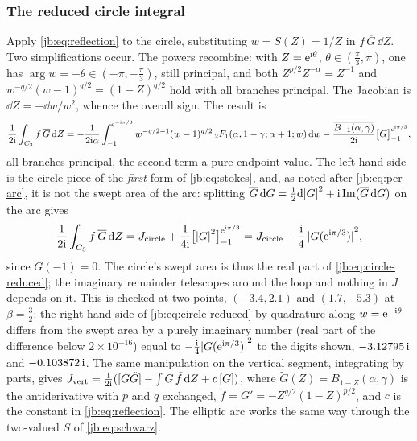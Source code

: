 \subsubsection{The reduced circle integral}
\label{jb:sec:obstruction:circle}

Apply \eqref{jb:eq:reflection} to the circle, substituting $w = S(Z) = 1/Z$ in
$f \, \overline{G} \, \dd Z$.
Two simplifications occur.
The powers recombine: with $Z = \mathrm{e}^{\mathrm{i} \theta}$, $\theta \in (\tfrac{\pi}{3}, \pi)$, one has
$\arg w = -\theta \in (-\pi, -\tfrac{\pi}{3})$, still principal, and both
$Z^{p/2} Z^{-\alpha} = Z^{-1}$ and $w^{-q/2} (w - 1)^{q/2} = (1 - Z)^{q/2}$ hold with all branches
principal.
The Jacobian is $\dd Z = - \dd w / w^2$, whence the overall sign.
The result is
\begin{equation}
  \label{jb:eq:circle-reduced}
  \frac{1}{2 \mathrm{i}} \int_{C_3} f \, \overline{G} \, \mathrm{d} Z
    = - \frac{1}{2 \mathrm{i} \alpha} \int_{-1}^{\mathrm{e}^{- \mathrm{i} \pi/3}}
      w^{- q/2 - 1} (w - 1)^{q/2} \,
      {}_2F_1(\alpha, 1 - \gamma; \alpha + 1; w) \, \mathrm{d} w
      - \frac{\overline{B_{-1}(\alpha, \gamma)}}{2 \mathrm{i}}
      \bigl[ G \bigr]_{-1}^{\mathrm{e}^{\mathrm{i} \pi/3}},
\end{equation}
all branches principal, the second term a pure endpoint value.
The left-hand side is the circle piece of the \emph{first} form of \eqref{jb:eq:stokes}, and, as
noted after \eqref{jb:eq:per-arc}, it is not the swept area of the arc: splitting
$\overline{G} \, \mathrm{d} G = \tfrac12 \mathrm{d} {|G|}^2 + \mathrm{i} \operatorname{Im}(\overline{G} \, \mathrm{d} G)$ on the arc gives
\begin{equation}
  \label{jb:eq:circle-first-form}
  \frac{1}{2 \mathrm{i}} \int_{C_3} f \, \overline{G} \, \mathrm{d} Z
    = J_{\text{circle}}
      + \frac{1}{4 \mathrm{i}} \bigl[ {|G|}^2 \bigr]_{-1}^{\mathrm{e}^{\mathrm{i} \pi/3}}
    = J_{\text{circle}}
      - \frac{\mathrm{i}}{4} \, {|G(\mathrm{e}^{\mathrm{i} \pi/3})|}^2,
\end{equation}
since $G(-1) = 0$.
The circle's swept area is thus the real part of \eqref{jb:eq:circle-reduced}; the imaginary
remainder telescopes around the loop and nothing in $J$ depends on it.
This is checked at two points, $(-3.4, 2.1)$ and $(1.7, -5.3)$ at $\beta = \tfrac32$: the
right-hand side of \eqref{jb:eq:circle-reduced} by quadrature along $w = \mathrm{e}^{-\mathrm{i}\theta}$ differs from
the swept area by a purely imaginary number (real part of the difference below
$2 \times 10^{-16}$) equal to $- \tfrac{\mathrm{i}}{4} {|G(\mathrm{e}^{\mathrm{i} \pi/3})|}^2$ to the digits shown,
$-3.12795 \, \mathrm{i}$ and $-0.103872 \, \mathrm{i}$.
The same manipulation on the vertical segment, integrating by parts, gives
$J_{\text{vert}} = \tfrac{1}{2 \mathrm{i}} ( [G \tilde G] - \int G \, \tilde f \, \mathrm{d} Z + c \, [G] )$, where
$\tilde G(Z) = B_{1 - Z}(\alpha, \gamma)$ is the antiderivative with $p$ and $q$ exchanged,
$\tilde f = \tilde G' = - Z^{q/2} (1 - Z)^{p/2}$, and $c$ is the constant in \eqref{jb:eq:reflection}.
The elliptic arc works the same way through the two-valued $S$ of \eqref{jb:eq:schwarz}.

